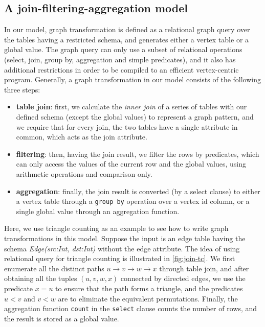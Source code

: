 \documentclass{sokendai_thesis} %
\begin{document}

\subsection{A join-filtering-aggregation model}
\label{sec:detailed-model}

In our model, graph transformation is defined as a relational graph query over the tables having a restricted schema, and generates either a vertex table or a global value.
The graph query can only use a subset of relational operations (select, join, group by, aggregation and simple predicates), and it also has additional restrictions in order to be compiled to an efficient vertex-centric program.
Generally, a graph transformation in our model consists of the following three steps:
\begin{itemize}
  \item \textbf{table join}:
    first, we calculate the \emph{inner join} of a series of tables with our defined schema (except the global values) to represent a graph pattern, and we require that for every join, the two tables have a single attribute in common, which acts as the join attribute.
  \item \textbf{filtering}:
    then, having the join result, we filter the rows by predicates, which can only access the values of the current row and the global values, using arithmetic operations and comparison only.
  \item \textbf{aggregation}:
    finally, the join result is converted (by a select clause) to either a vertex table through a \texttt{group by} operation over a vertex id column, or a single global value through an aggregation function.
\end{itemize}

Here, we use triangle counting as an example to see how to write graph transformations in this model.
Suppose the input is an edge table having the schema \textit{Edge(src:Int, dst:Int)} without the edge attribute.
The idea of using relational query for triangle counting is illustrated in \autoref{fig:join-tc}.
We first enumerate all the distinct paths $u\rightarrow v\rightarrow w\rightarrow x$ through table join, 
and after obtaining all the tuples $(u, v, w, x)$ connected by directed edges, we use the predicate $x=u$ to ensure that the path forms a triangle, and the predicates $u<v$ and $v<w$ are to eliminate the equivalent permutations.
Finally, the aggregation function \texttt{count} in the \texttt{select} clause counts the number of rows, and the result is stored as a global value.
\end{document}
